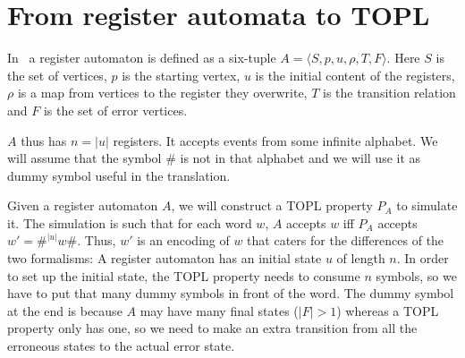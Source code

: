 \section{From register automata to TOPL}
In~\cite{dblp:journals/tcs/kaminskif94} a register automaton is
defined as a six-tuple $A = \langle S, p, u, \rho, T, F\rangle$. Here $S$
is the set of vertices, $p$ is the starting vertex, $u$ is the initial
content of the registers, $\rho$ is a map from vertices to the
register they overwrite, $T$ is the transition relation and $F$ is the
set of error vertices.

$A$ thus has $n = |u|$ registers. It accepts events from some infinite
alphabet. We will assume that the symbol $\#$ is not in that alphabet and we will use it as dummy symbol useful in the translation.

Given a register automaton $A$, we will construct a TOPL property $P_A$ to simulate it. The
simulation is such that for each word $w$, $A$ accepts $w$ iff $P_A$
accepts $w' = \#^{|u|}w\#$. Thus, $w'$ is an encoding of $w$ that
caters for the differences of the two formalisms: A register automaton has an
initial state $u$ of length $n$. In order to set up the initial
state, the TOPL property needs to consume $n$ symbols, so we have to
put that many dummy symbols in front of the word. The dummy symbol at
the end is because $A$ may have many final states ($|F| > 1$) whereas a TOPL
property only has one, so we need to make an extra transition from all
the erroneous states to the actual error state.

